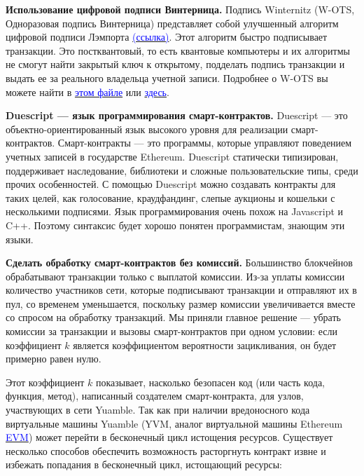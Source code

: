 \documentclass[11pt]{article}
\begin{document}
\begin{multicols}{2}
\vspace{1\baselineskip}
\textbf{Использование цифровой подписи Винтерница.}
Подпись Winternitz (W-OTS, Одноразовая подпись Винтерница) представляет собой улучшенный алгоритм цифровой подписи Лэмпорта \href{https://en.wikipedia.org/wiki/Lamport_signature}{\textcolor{blue}{(ссылка)}}. Этот алгоритм быстро подписывает транзакции. Это постквантовый, то есть квантовые компьютеры и их алгоритмы не смогут найти закрытый ключ к открытому, подделать подпись транзакции и выдать ее за реального владельца учетной записи. Подробнее о W-OTS вы можете найти в \href{https://eprint.iacr.org/2011/191.pdf}{\textcolor{blue}{этом файле}} или \href{https://huelsing.net/wordpress/wp-content/uploads/2013/05/wotsspr.pdf}{\textcolor{blue}{здесь}}.

\vspace{1\baselineskip}
\textbf{Duescript — язык программирования смарт-контрактов.}
Duescript — это объектно-ориентированный язык высокого уровня для реализации смарт-контрактов. Смарт-контракты — это программы, которые управляют поведением учетных записей в государстве Ethereum. Duescript статически типизирован, поддерживает наследование, библиотеки и сложные пользовательские типы, среди прочих особенностей. С помощью Duescript можно создавать контракты для таких целей, как голосование, краудфандинг, слепые аукционы и кошельки с несколькими подписями. Язык программирования очень похож на Javascript и C++. Поэтому синтаксис будет хорошо понятен программистам, знающим эти языки.

\vspace{1\baselineskip}
\textbf{Сделать обработку смарт-контрактов без комиссий.}
Большинство блокчейнов обрабатывают транзакции только с выплатой комиссии. Из-за уплаты комиссии количество участников сети, которые подписывают транзакции и отправляют их в пул, со временем уменьшается, поскольку размер комиссии увеличивается вместе со спросом на обработку транзакций. Мы приняли главное решение — убрать комиссии за транзакции и вызовы смарт-контрактов при одном условии: если коэффициент $k$ является коэффициентом вероятности зацикливания, он будет примерно равен нулю.

Этот коэффициент $k$ показывает, насколько безопасен код (или часть кода, функция, метод), написанный создателем смарт-контракта, для узлов, участвующих в сети Yuamble. Так как при наличии вредоносного кода виртуальные машины Yuamble (YVM, аналог виртуальной машины Ethereum \href{https://ethereum.org/en/developers/docs/evm/}{\textcolor{blue}{EVM}}) может перейти в бесконечный цикл истощения ресурсов.  Существует несколько способов обеспечить возможность расторгнуть контракт извне и избежать попадания в бесконечный цикл, истощающий ресурсы:


\end{multicols}
\end{document}
